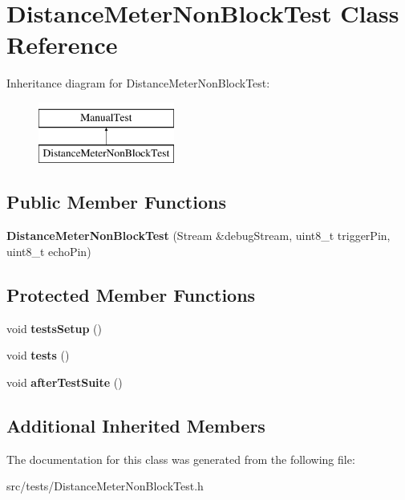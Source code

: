 \hypertarget{class_distance_meter_non_block_test}{}\section{Distance\+Meter\+Non\+Block\+Test Class Reference}
\label{class_distance_meter_non_block_test}
Inheritance diagram for Distance\+Meter\+Non\+Block\+Test\+:\begin{figure}[H]
\begin{center}
\leavevmode
\includegraphics[height=2.000000cm]{class_distance_meter_non_block_test}
\end{center}
\end{figure}
\subsection*{Public Member Functions}
\begin{DoxyCompactItemize}
\item 
\mbox{\label{class_distance_meter_non_block_test_a99e42bd9c7d0238c003e061cfcf56cfa}} 
{\bfseries Distance\+Meter\+Non\+Block\+Test} (Stream \&debug\+Stream, uint8\+\_\+t trigger\+Pin, uint8\+\_\+t echo\+Pin)
\end{DoxyCompactItemize}
\subsection*{Protected Member Functions}
\begin{DoxyCompactItemize}
\item 
\mbox{\label{class_distance_meter_non_block_test_a183198c75523b1713a520222cfe234fe}} 
void {\bfseries tests\+Setup} ()
\item 
\mbox{\label{class_distance_meter_non_block_test_adbda1a19bc7753473f52d5eb37f8b35e}} 
void {\bfseries tests} ()
\item 
\mbox{\label{class_distance_meter_non_block_test_aba1fc21d6c1f087c224a9269d76eb5a8}} 
void {\bfseries after\+Test\+Suite} ()
\end{DoxyCompactItemize}
\subsection*{Additional Inherited Members}


The documentation for this class was generated from the following file\+:\begin{DoxyCompactItemize}
\item 
src/tests/Distance\+Meter\+Non\+Block\+Test.\+h\end{DoxyCompactItemize}
